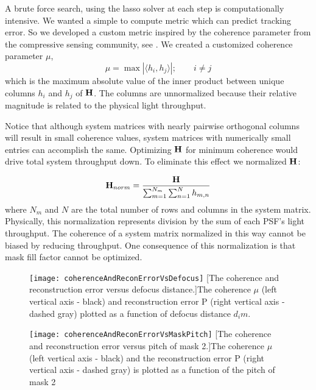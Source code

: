A brute force search, using the \gls{lasso} solver at each step is computationally intensive. We wanted a simple to compute metric which can predict tracking error. So we developed a custom metric inspired by the coherence parameter from the compressive sensing community, see . We created a customized coherence parameter $\mu$, 
%
\begin{equation}\label{defofcoherence}
    \mu = \max{\left| \langle h_i, h_j \rangle \right|} ;  \qquad i \neq j
\end{equation}
%
which is the maximum absolute value of the inner product between unique columns $h_i$ and $h_j$ of $\displaystyle \mathbf{H}$. The columns are unnormalized because their relative magnitude is related to the physical light throughput. 

Notice that although system matrices with nearly pairwise orthogonal columns will result in small coherence values, system matrices with numerically small entries can accomplish the same. Optimizing $\displaystyle \mathbf{H}$ for minimum coherence would drive total system throughput down. To eliminate this effect we normalized $\displaystyle \mathbf{H}$:

\begin{equation}
	\displaystyle \mathbf{H}_{norm} = \frac{ \displaystyle \mathbf{H} }{ \sum_{m = 1}^{N_m} \sum_{n = 1}^{N} h_{m,n} }
\end{equation}
%
where $N_m$ and $N$ are the total number of rows and columns in the system matrix. Physically, this normalization represents division by the sum of each PSF’s light throughput. The coherence of a system matrix normalized in this way cannot be biased by reducing throughput. One consequence of this normalization is that mask fill factor cannot be optimized.

\begin{figure}[!ht]
	\texttt{[image: coherenceAndReconErrorVsDefocus]}
	[The coherence and reconstruction error versus defocus distance.]{The coherence $\mu$ (left vertical axis - black) and reconstruction error P (right vertical axis - dashed gray) plotted as a function of defocus distance $d_im$. }
	\label{fig:coherenceAndReconErrorVsDefocus}
\end{figure}

\begin{figure}[!ht]
	\texttt{[image: coherenceAndReconErrorVsMaskPitch]}
	[The coherence and reconstruction error versus pitch of mask 2.]{The coherence $\mu$ (left vertical axis - black) and the reconstruction error P (right vertical axis - dashed gray) is plotted as a function of the pitch of mask 2 }
	\label{fig:coherenceAndReconErrorVsMaskPitch}
\end{figure}


